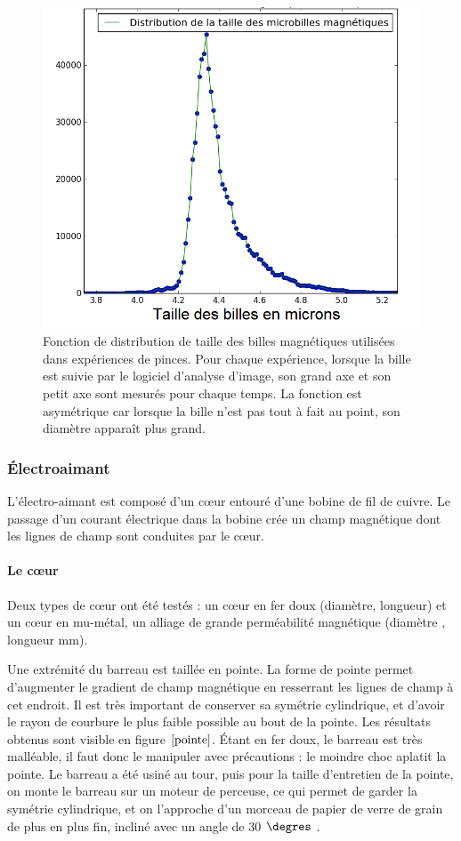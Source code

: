 \documentclass{report}
\begin{document}
		\begin{figure}
		\includegraphics[scale=0.3]{Taille_des_billes.png}
		\caption{Fonction de distribution de taille des billes magnétiques utilisées dans  expériences de pinces. Pour chaque expérience, lorsque la bille est suivie par le logiciel d'analyse d'image, son grand axe et son petit axe sont mesurés pour chaque temps. La fonction est asymétrique car lorsque la bille n'est pas tout à fait au point, son diamètre apparaît plus grand.}
\end{figure}		 
		
		\subsubsection{\'Electroaimant}
		L'électro-aimant est composé d'un c\oe ur entouré d'une bobine de fil de cuivre. Le passage d'un courant électrique dans la bobine crée un champ magnétique dont les lignes de champ sont conduites par le c\oe ur. 
		
		\paragraph{Le c\oe ur} Deux types de c\oe ur ont été testés : un c\oe ur en fer doux (diamètre, longueur) et un c\oe ur en mu-métal, un alliage de grande perméabilité magnétique (diamètre  , longueur mm).
		
		Une extrémité du barreau est taillée en pointe. La forme de pointe permet d'augmenter le gradient de champ magnétique en resserrant les lignes de champ à cet endroit. Il est très important de conserver sa symétrie cylindrique, et d'avoir le rayon de courbure le plus faible possible au bout de la pointe. Les résultats obtenus sont visible en figure $\ref{pointe}$. \'Etant en fer doux, le barreau est très malléable, il faut donc le manipuler avec précautions : le moindre choc aplatit la pointe. 
	 Le barreau a été usiné au tour, puis pour la taille d'entretien de la pointe, on monte le barreau sur un moteur de perceuse, ce qui permet de garder la symétrie cylindrique, et on l'approche d'un morceau de papier de verre de grain de plus en plus fin, incliné avec un angle de 30 $\degres$ .
	 
\end{document}
